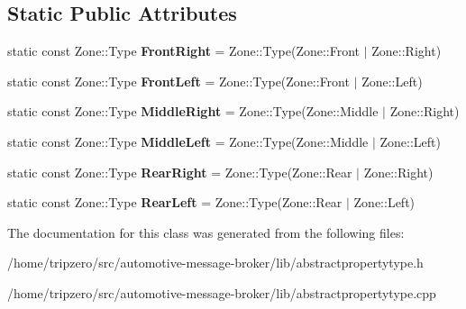\subsection*{Static Public Attributes}
\begin{DoxyCompactItemize}
\item 
\hypertarget{classZone_a37315b6f9837e00447422775a96a20ca}{static const Zone\-::\-Type {\bfseries Front\-Right} = Zone\-::\-Type(Zone\-::\-Front $\vert$ Zone\-::\-Right)}\label{classZone_a37315b6f9837e00447422775a96a20ca}

\item 
\hypertarget{classZone_a6a87ff703e79adeb7c1d625565b19465}{static const Zone\-::\-Type {\bfseries Front\-Left} = Zone\-::\-Type(Zone\-::\-Front $\vert$ Zone\-::\-Left)}\label{classZone_a6a87ff703e79adeb7c1d625565b19465}

\item 
\hypertarget{classZone_a1d569d1d452b7c9201572882076afff0}{static const Zone\-::\-Type {\bfseries Middle\-Right} = Zone\-::\-Type(Zone\-::\-Middle $\vert$ Zone\-::\-Right)}\label{classZone_a1d569d1d452b7c9201572882076afff0}

\item 
\hypertarget{classZone_a750a3ead97ed9634c09e2cd581052be2}{static const Zone\-::\-Type {\bfseries Middle\-Left} = Zone\-::\-Type(Zone\-::\-Middle $\vert$ Zone\-::\-Left)}\label{classZone_a750a3ead97ed9634c09e2cd581052be2}

\item 
\hypertarget{classZone_a0e756f33e1f50c13ee13fe46027a1359}{static const Zone\-::\-Type {\bfseries Rear\-Right} = Zone\-::\-Type(Zone\-::\-Rear $\vert$ Zone\-::\-Right)}\label{classZone_a0e756f33e1f50c13ee13fe46027a1359}

\item 
\hypertarget{classZone_a7c83e580e0478be716f344eb56a041e3}{static const Zone\-::\-Type {\bfseries Rear\-Left} = Zone\-::\-Type(Zone\-::\-Rear $\vert$ Zone\-::\-Left)}\label{classZone_a7c83e580e0478be716f344eb56a041e3}

\end{DoxyCompactItemize}


The documentation for this class was generated from the following files\-:\begin{DoxyCompactItemize}
\item 
/home/tripzero/src/automotive-\/message-\/broker/lib/abstractpropertytype.\-h\item 
/home/tripzero/src/automotive-\/message-\/broker/lib/abstractpropertytype.\-cpp\end{DoxyCompactItemize}
